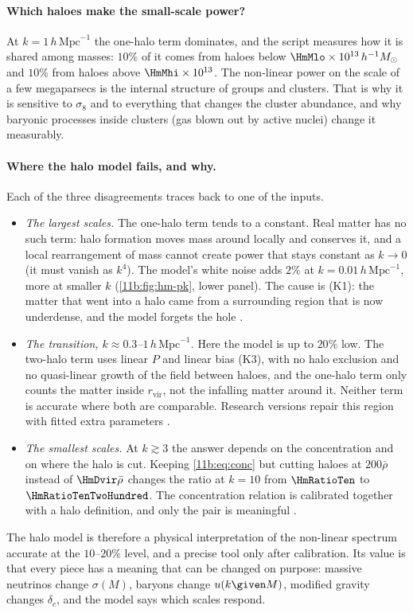 \paragraph{Which haloes make the small-scale power?}
At $k=1\,h\,\mathrm{Mpc}^{-1}$ the one-halo term dominates, and the script
measures how it is shared among masses: $10\%$ of it comes from haloes below
$\HmMlo\times10^{13}\,h^{-1}M_\odot$ and $10\%$ from haloes above
$\HmMhi\times10^{13}$. The non-linear power on the scale of a few megaparsecs is
the internal structure of groups and clusters. That is why it is sensitive to
$\sigma_8$ and to everything that changes the cluster abundance, and why baryonic
processes inside clusters (gas blown out by active nuclei) change it measurably.

\paragraph{Where the halo model fails, and why.}
Each of the three disagreements traces back to one of the inputs.
\begin{itemize}[itemsep=2pt]
  \item \emph{The largest scales.} The one-halo term tends to a constant. Real
        matter has no such term: halo formation moves mass around locally and
        conserves it, and a local rearrangement of mass cannot create power
        that stays constant as $k\to0$ (it must vanish as $k^4$). The model's
        white noise adds $2\%$ at $k=0.01\,h\,\mathrm{Mpc}^{-1}$, more at smaller
        $k$ (\cref{11b:fig:hm-pk}, lower panel). The cause is (K1): the matter
        that went into a halo came from a surrounding region that is now
        underdense, and the model forgets the hole
        .
  \item \emph{The transition, $k\approx0.3$--$1\,h\,\mathrm{Mpc}^{-1}$.} Here the
        model is up to $20\%$ low. The two-halo term uses linear $P$ and linear bias
        (K3), with no halo exclusion and no quasi-linear growth of the field
        between haloes, and the one-halo term only counts the matter inside
        $r_{\mathrm{vir}}$, not the infalling matter around it. Neither term
        is accurate where both are comparable. Research versions repair this region
        with fitted extra parameters \cite{Mead2015}.
  \item \emph{The smallest scales.} At $k\gtrsim3$ the answer depends on the
        concentration and on where the halo is cut. Keeping \eqref{11b:eq:conc}
        but cutting haloes at $200\bar\rho$ instead of $\HmDvir\bar\rho$ changes the
        ratio at $k=10$ from $\HmRatioTen$ to $\HmRatioTenTwoHundred$. The
        concentration relation is calibrated together with a halo definition,
        and only the pair is meaningful .
\end{itemize}
The halo model is therefore a physical interpretation of the non-linear spectrum
accurate at the $10$--$20\%$ level, and a precise tool only after calibration.
Its value is that every piece has a meaning that can be changed on purpose:
massive neutrinos change $\sigma(M)$, baryons change $u(k\given M)$, modified gravity
changes $\delta_c$, and the model says which scales respond.

